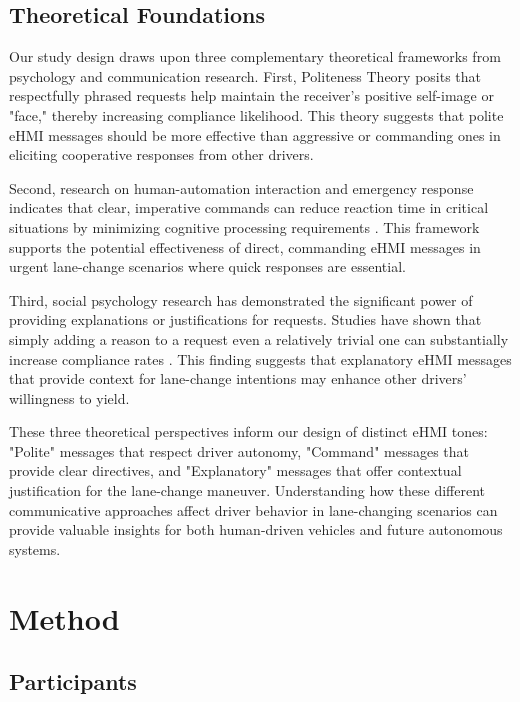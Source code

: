 \documentclass[manuscript,review]{acmart}
\begin{document}
\subsection{Theoretical Foundations}

Our study design draws upon three complementary theoretical frameworks from psychology and communication research. First, Politeness Theory \cite{brown1987politeness, mahadevan2018communicating} posits that respectfully phrased requests help maintain the receiver's positive self-image or "face," thereby increasing compliance likelihood. This theory suggests that polite eHMI messages should be more effective than aggressive or commanding ones in eliciting cooperative responses from other drivers.

Second, research on human-automation interaction and emergency response indicates that clear, imperative commands can reduce reaction time in critical situations by minimizing cognitive processing requirements \cite{merat2012highly, parasuraman1997humans}. This framework supports the potential effectiveness of direct, commanding eHMI messages in urgent lane-change scenarios where quick responses are essential.

Third, social psychology research has demonstrated the significant power of providing explanations or justifications for requests. Studies have shown that simply adding a reason to a request even a relatively trivial one can substantially increase compliance rates \cite{burger2004coincidence}. This finding suggests that explanatory eHMI messages that provide context for lane-change intentions may enhance other drivers' willingness to yield.

These three theoretical perspectives inform our design of distinct eHMI tones: "Polite" messages that respect driver autonomy, "Command" messages that provide clear directives, and "Explanatory" messages that offer contextual justification for the lane-change maneuver. Understanding how these different communicative approaches affect driver behavior in lane-changing scenarios can provide valuable insights for both human-driven vehicles and future autonomous systems.

\section{Method}

\subsection{Participants}
\end{document}
